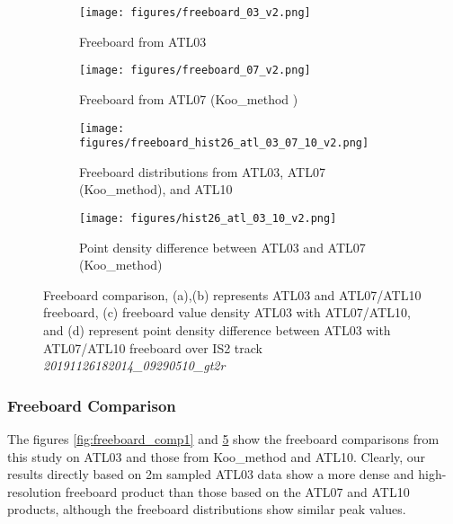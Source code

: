 \begin{figure}[!htb]
        \centering
        \begin{subfigure}[b]{\linewidth}
            \centering
            \texttt{[image: figures/freeboard\_03\_v2.png]}
            \caption{Freeboard from ATL03}
            \label{fig:freeboard_03}
        \end{subfigure}
        \begin{subfigure}[b]{\linewidth}
            \centering
            \texttt{[image: figures/freeboard\_07\_v2.png]}
            \caption{Freeboard from ATL07 (Koo\_method \cite{koo2023sea})}
            \label{fig:freeboard_07}
        \end{subfigure}
        \begin{subfigure}[b]{0.9\linewidth}
            \centering
            \texttt{[image: figures/freeboard\_hist26\_atl\_03\_07\_10\_v2.png]}
            \caption{Freeboard distributions from ATL03, ATL07 (Koo\_method), and ATL10}
            \label{fig:freeboard_hist26_atl_03_07_10_v1}
        \end{subfigure}
        \begin{subfigure}[b]{\linewidth}
            \centering
            \texttt{[image: figures/hist26\_atl\_03\_10\_v2.png]}
            \caption{Point density difference between ATL03 and ATL07 (Koo\_method)}
            \label{fig:hist26_atl_03_10}
        \end{subfigure}
    \caption{Freeboard comparison, (a),(b) represents ATL03 and ATL07/ATL10 freeboard, (c) freeboard value density ATL03 with ATL07/ATL10, and (d) represent point density difference between ATL03 with ATL07/ATL10 freeboard over IS2 track \textit{20191126182014\_09290510\_gt2r}}
    \label{fig:freeboard_comp2}
\end{figure}

\subsubsection{Freeboard Comparison}
The figures \ref{fig:freeboard_comp1} and \ref{fig:freeboard_comp2} show the freeboard comparisons from this study on ATL03 and those from Koo\_method and ATL10. 
Clearly, our results directly based on 2m sampled ATL03 data show a more dense and high-resolution freeboard product than those based on the ATL07 and ATL10 products, although the freeboard distributions show similar peak values. 

